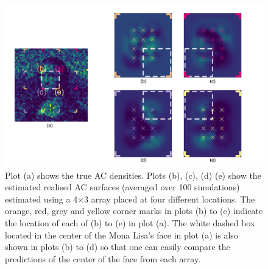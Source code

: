 \documentclass[useAMS,usenatbib,referee]{biom}
\begin{document}
\begin{figure}[htbp]
\centering
\includegraphics[width=1\textwidth]{mona_torch_higheffort.png}
\caption{Plot (a) shows the true AC densities. Plots (b), (c), (d) (e) show the estimated realised AC surfaces (averaged over 100 simulations) estimated using a 4$\times$3 array placed at four different locations. The orange, red, grey and yellow corner marks in plots (b) to (e) indicate the location of each of (b) to (e) in plot (a). The white dashed box located in the center of the Mona Lisa's face in plot (a) is also shown in plots (b) to (d) so that one can easily compare the predictions of the center of the face from each array.}
\label{mona_torch_higheffort}
\end{figure}


\end{document}
